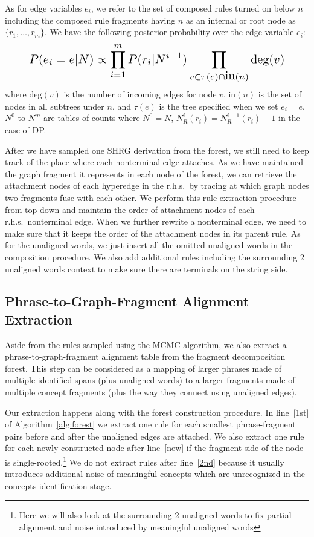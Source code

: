 As for edge variables $e_i$, we refer to the set of composed rules turned on below $n$ including the 
composed rule fragments having $n$ as an internal or root node as $\{r_1,\ldots,r_m\}$. We have the 
following posterior probability over the edge variable $e_i$:
\begin{equation}
\resizebox{.88\hsize}{!}{$\displaystyle
P(e_i = e| N) \propto \prod_{i=1}^m P(r_i| N^{i-1}) \prod_{v \in \tau(e)\cap \mbox{in}(n)} \mbox{deg}(v)
$}
\end{equation}
where $\mbox{deg}(v)$ is the number of incoming edges for node $v$, 
$\mbox{in}(n)$ is the set of nodes 
in all subtrees under $n$, and $\tau(e)$ is the tree specified when we set $e_i = e$. $N^0$ to $N^m$ 
are tables of counts where $N^0 = N$, $N^i_R(r_i) = N^{i-1}_R(r_i) + 1$ in the case of DP.


After we have sampled one SHRG derivation from the forest, we still need to keep track of the place where each nonterminal edge attaches.
As we have maintained the graph fragment it represents in each node of the forest, we can retrieve the attachment nodes of each hyperedge in the r.h.s.\ by tracing at 
which graph nodes two fragments fuse with each other. We perform this rule extraction procedure from top-down and maintain the order of attachment nodes of each r.h.s.\
nonterminal edge.
When we further rewrite a nonterminal edge, we need to make sure that it keeps the order of the attachment nodes in its parent rule. 
As for the unaligned words, we just insert all the omitted unaligned words in the
composition procedure. We also add additional rules including the surrounding 2 unaligned words context to
make sure there are terminals on the string side.

\subsection{Phrase-to-Graph-Fragment Alignment Extraction}
Aside from the rules sampled using the MCMC algorithm,
we also extract a phrase-to-graph-fragment alignment table from the fragment decomposition forest.
This step can be considered as a mapping of larger phrases made of multiple identified spans (plus unaligned words) to a larger fragments made of multiple concept fragments (plus the way they connect using unaligned edges).


Our extraction happens along with the forest construction procedure. In line~\ref{1st} of Algorithm~\ref{alg:forest}
we extract one rule for each smallest phrase-fragment pairs before and after the unaligned
edges are attached. We also extract one rule for each newly constructed node after line~\ref{new} 
if the fragment side of the node is single-rooted.\footnote{Here we will also look at the surrounding 2 unaligned words to fix partial alignment and noise introduced
by meaningful unaligned words}
We do not extract rules after line~\ref{2nd} because it
usually introduces additional noise of meaningful concepts which are unrecognized in the concepts
identification stage. %

